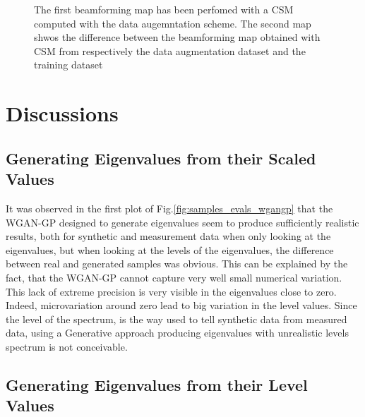 \documentclass[11pt,a4paper,twoside]{report}
\begin{document}
\begin{figure}
    \centering
    \caption{The first beamforming map has been perfomed with a CSM computed with the data augemntation scheme. The second map shwos the difference between the beamforming map obtained with CSM from respectively the data augmentation dataset and the training dataset}
    \label{fig:beamforming_map_data_augmentation}
\end{figure}

\chapter{Discussions}

\section{Generating Eigenvalues from their Scaled Values}

It was observed in the first plot of Fig.\ref{fig:samples_evals_wgangp} that the WGAN-GP designed to generate eigenvalues seem to produce sufficiently realistic results, both for synthetic and measurement data when only looking at the eigenvalues, but when looking at the levels of the eigenvalues, the difference between real and generated samples was obvious. This can be explained by the fact, that the WGAN-GP cannot capture very well small numerical variation. This lack of extreme precision is very visible in the eigenvalues close to zero. Indeed, microvariation around zero lead to big variation in the level values. Since the level of the spectrum, is the way used to tell synthetic data from measured data, using a Generative approach producing eigenvalues with unrealistic levels spectrum is not conceivable. 

\section{Generating Eigenvalues from their Level Values}
\end{document}
